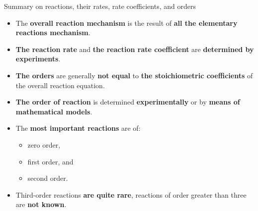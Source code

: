 \begin{frame}[<+->]{Summary on reactions, their rates, rate coefficients, and orders}
	\small
	\begin{itemize}
		\item The \alert{\bf overall reaction mechanism} is the result of {\bf all the elementary reactions mechanism}.
		\item {\bf The reaction rate} and {\bf the reaction rate coefficient} are \alert{\bf determined by experiments}.
		\item {\bf The orders} are generally \alert{\bf not equal} to {\bf the stoichiometric coefficients} of the overall
		reaction equation.
		\item {\bf The order of reaction} is determined \alert{\bf experimentally} or by \alert{\bf means of mathematical models}.
		\item The \alert{\bf most important reactions} are of: 
		\begin{itemize}
			\item zero order, 
			\item first order, and 
			\item second order.
		\end{itemize}
		\item Third-order reactions {\bf are quite rare}, reactions of order greater than three are {\bf not known}.
		
	\end{itemize}
\end{frame}
%
